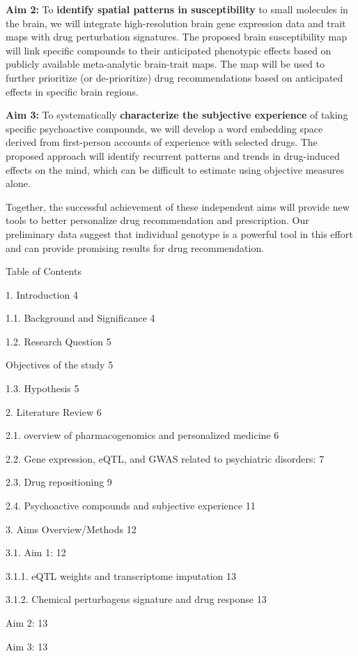 \documentclass[
]{article}
\begin{document}
\textbf{Aim 2:} To \textbf{identify spatial patterns in susceptibility}
to small molecules in the brain, we will integrate high-resolution brain
gene expression data and trait maps with drug perturbation signatures.
The proposed brain susceptibility map will link specific compounds to
their anticipated phenotypic effects based on publicly available
meta-analytic brain-trait maps. The map will be used to further
prioritize (or de-prioritize) drug recommendations based on anticipated
effects in specific brain regions.{~}

\textbf{Aim 3:} To systematically \textbf{characterize the subjective
experience} of taking specific psychoactive compounds, we will develop a
word embedding space derived from first-person accounts of experience
with selected drugs. The proposed approach will identify recurrent
patterns and trends in drug-induced effects on the mind, which can be
difficult to estimate using objective measures alone.{~}

Together, the successful achievement of these independent aims will
provide new tools to better personalize drug recommendation and
prescription. Our preliminary data suggest that individual genotype is a
powerful tool in this effort and can provide promising results for drug
recommendation.{~}

Table of Contents

1. Introduction{ }4

1.1. Background and Significance{ }4

1.2. Research Question{ }5

Objectives of the study{ }5

1.3. Hypothesis{ }5

2. Literature Review{ }6

2.1. overview of pharmacogenomics and personalized medicine{ }6

2.2. Gene expression, eQTL, and GWAS related to psychiatric disorders:{
}7

2.3. Drug repositioning{ }9

2.4. Psychoactive compounds and subjective experience{ }11

3. Aims Overview/Methods{ }12

3.1. Aim 1:{ }12

3.1.1. eQTL weights and transcriptome imputation{ }13

3.1.2. Chemical perturbagens signature and drug response{ }13

Aim 2:{ }13

Aim 3:{ }13
\end{document}
